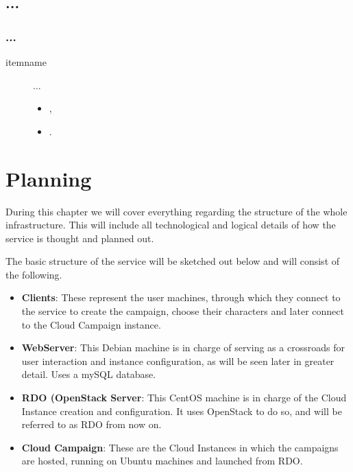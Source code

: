 \documentclass[a4paper,12pt]{report}
\begin{document}


\section{...}
\label{sec:}



%
\subsection{...}
\label{ssec:}

\begin{description}
  \item[itemname] ... 

    \begin{itemize}
      \item \texttt{},
      \item \texttt{}. 
    \end{itemize} 
   
\end{description}

%

\section{}
\label{sec:}


\chapter{Planning}
\label{ch:plan}

During this chapter we will cover everything regarding the structure of the whole infrastructure. This will include all technological and logical details of how the service is thought and planned out.

The basic structure of the service will be sketched out below and will consist of the following.
\begin{itemize}
    \item \textbf{Clients}: These represent the user machines, through which they connect to the service to create the campaign, choose their characters and later connect to the Cloud Campaign instance.
    \item \textbf{WebServer}: This Debian machine is in charge of serving as a crossroads for user interaction and instance configuration, as will be seen later in greater detail. Uses a mySQL database.
    \item \textbf{RDO (OpenStack Server}: This CentOS machine is in charge of the Cloud Instance creation and configuration. It uses OpenStack to do so, and will be referred to as RDO from now on.
    \item \textbf{Cloud Campaign}: These are the Cloud Instances in which the campaigns are hosted, running on Ubuntu machines and launched from RDO.
\end{itemize}
\end{document}
